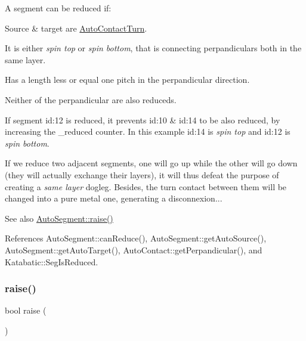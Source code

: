A segment can be reduced if\+:
\begin{DoxyItemize}
\item Source \& target are \mbox{\hyperlink{classKatabatic_1_1AutoContactTurn}{Auto\+Contact\+Turn}}.
\item It is either {\itshape spin top} or {\itshape spin bottom}, that is connecting perpandiculars both in the same layer.
\item Has a length less or equal one pitch in the perpandicular direction.
\item Neither of the perpandicular are also reduceds.
\end{DoxyItemize}

 If segment {\ttfamily id\+:12} is reduced, it prevents {\ttfamily id\+:10} \& {\ttfamily id\+:14} to be also reduced, by increasing the {\ttfamily \+\_\+reduced} counter. In this example {\ttfamily id\+:14} is {\itshape spin top} and {\ttfamily id\+:12} is {\itshape spin bottom}.

If we reduce two adjacent segments, one will go up while the other will go down (they will actually exchange their layers), it will thus defeat the purpose of creating a {\itshape same layer} dogleg. Besides, the turn contact between them will be changed into a pure metal one, generating a disconnexion...

\begin{DoxySeeAlso}{See also}
\mbox{\hyperlink{classKatabatic_1_1AutoSegment_ace393c3c082a5e62a348168354660e39}{Auto\+Segment\+::raise()}} 
\end{DoxySeeAlso}


References Auto\+Segment\+::can\+Reduce(), Auto\+Segment\+::get\+Auto\+Source(), Auto\+Segment\+::get\+Auto\+Target(), Auto\+Contact\+::get\+Perpandicular(), and Katabatic\+::\+Seg\+Is\+Reduced.

\mbox{\label{classKatabatic_1_1AutoSegment_ace393c3c082a5e62a348168354660e39}} 
\subsubsection{\texorpdfstring{raise()}{raise()}}
{\footnotesize\ttfamily bool raise (\begin{DoxyParamCaption}{ }\end{DoxyParamCaption})}

